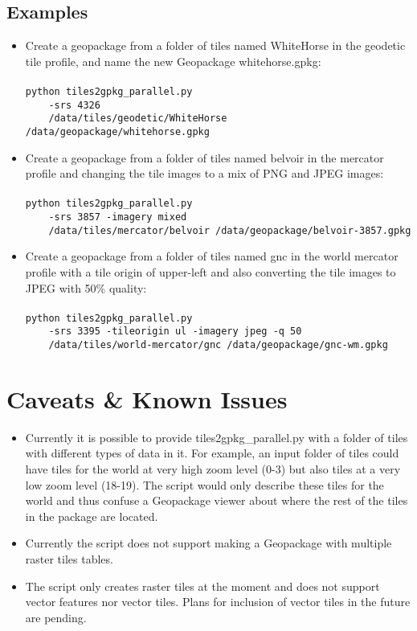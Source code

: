 \documentclass{article}
\begin{document}
\subsection{Examples}
\begin{itemize}
    \item
        Create a geopackage from a folder of tiles named WhiteHorse in the
        geodetic tile profile, and name the new Geopackage whitehorse.gpkg:\\
        \\
        \lstinline|python tiles2gpkg_parallel.py|\\
        \lstinline|    -srs 4326|\\
        \lstinline|    /data/tiles/geodetic/WhiteHorse /data/geopackage/whitehorse.gpkg|
    \item
        Create a geopackage from a folder of tiles named belvoir in the
        mercator profile and changing the tile images to a mix of PNG and JPEG
        images:\\
        \\
        \lstinline|python tiles2gpkg_parallel.py|\\
        \lstinline|    -srs 3857 -imagery mixed|\\
        \lstinline|    /data/tiles/mercator/belvoir /data/geopackage/belvoir-3857.gpkg|
    \item
        Create a geopackage from a folder of tiles named gnc in the world
        mercator profile with a tile origin of upper-left and also converting
        the tile images to JPEG with 50\% quality:\\
        \\
        \lstinline|python tiles2gpkg_parallel.py|\\
        \lstinline|    -srs 3395 -tileorigin ul -imagery jpeg -q 50|\\
        \lstinline|    /data/tiles/world-mercator/gnc /data/geopackage/gnc-wm.gpkg|
\end{itemize}

\section{Caveats \& Known Issues}
\begin{itemize}
    \item
        Currently it is possible to provide tiles2gpkg\_parallel.py with a
        folder of tiles with different types of data in it.  For example, an
        input folder of tiles could have tiles for the world at very high zoom
        level (0-3) but also tiles at a very low zoom level (18-19).  The
        script would only describe these tiles for the world and thus confuse a
        Geopackage viewer about where the rest of the tiles in the package are
        located.
    \item
        Currently the script does not support making a Geopackage with multiple
        raster tiles tables.
    \item
        The script only creates raster tiles at the moment and does not support
        vector features nor vector tiles.  Plans for inclusion of vector tiles
        in the future are pending.
\end{itemize}
\end{document}
